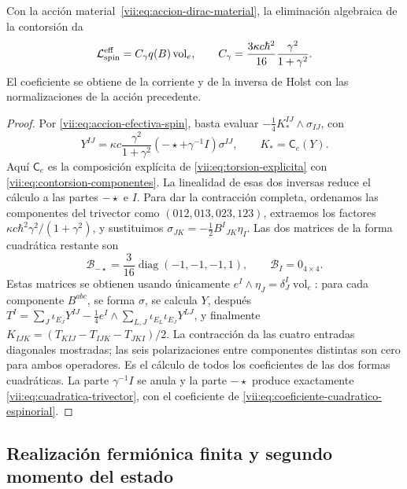 \begin{theorem}
\label{vii:thm:coeficiente-torsional-espinorial}
Con la acción material~\eqref{vii:eq:accion-dirac-material}, la
eliminación algebraica de la contorsión da
\begin{equation}
 \mathcal L_{\rm spin}^{\rm eff}
 =C_\gamma q(B)\operatorname{vol}_e,\qquad
 C_\gamma=\frac{3\kappa c\hbar^2}{16}
                      \frac{\gamma^2}{1+\gamma^2}.
 \label{vii:eq:coeficiente-cuadratico-espinorial}
\end{equation}
El coeficiente se obtiene de la corriente y de la inversa de Holst
con las normalizaciones de la acción precedente.
\end{theorem}
\begin{proof}
Por \eqref{vii:eq:accion-efectiva-spin}, basta evaluar
\(-\frac14K_*^{IJ}\wedge\sigma_{IJ}\), con
\[
 Y^{IJ}=\kappa c\frac{\gamma^2}{1+\gamma^2}
           (-\star+\gamma^{-1}I)\sigma^{IJ},\qquad
 K_*=\mathsf C_e(Y).
\]
Aquí \(\mathsf C_e\) es la composición explícita de
\eqref{vii:eq:torsion-explicita} con
\eqref{vii:eq:contorsion-componentes}. La linealidad de esas dos
inversas reduce el cálculo a las partes \(-\star\) e \(I\).
Para dar la contracción completa, ordenamos las componentes del
trivector como \((012,013,023,123)\), extraemos los factores
\(\kappa c\hbar^2\gamma^2/(1+\gamma^2)\), y sustituimos
\(\sigma_{JK}=-\frac12B^I{}_{JK}\eta_I\). Las dos matrices
de la forma cuadrática restante son
\begin{equation}
 \mathcal B_{-\star}
 =\frac3{16}\operatorname{diag}(-1,-1,-1,1),\qquad
 \mathcal B_I=0_{4\times4}.
 \label{vii:eq:matrices-contraccion-espinorial}
\end{equation}
Estas matrices se obtienen usando únicamente
\(e^I\wedge\eta_J=\delta_J^I\operatorname{vol}_e\): para
cada componente \(B^{abc}\), se forma \(\sigma\), se calcula
\(Y\), después
\(T^I=\sum_J\iota_{E_J}Y^{IJ}
 -\frac14e^I\wedge\sum_{L,J}\iota_{E_L}\iota_{E_J}Y^{LJ}\),
y finalmente
\(K_{IJK}=(T_{KIJ}-T_{IJK}-T_{JKI})/2\).
La contracción da las cuatro entradas diagonales mostradas; las
seis polarizaciones entre componentes distintas son cero para ambos
operadores. Es el cálculo de todos los coeficientes de las dos
formas cuadráticas. La parte \(\gamma^{-1}I\) se anula y la parte
\(-\star\) produce exactamente \eqref{vii:eq:cuadratica-trivector},
con el coeficiente de \eqref{vii:eq:coeficiente-cuadratico-espinorial}.
\end{proof}

\subsection{Realización fermiónica finita y segundo momento del estado}
\label{vii:subsec:segundo-momento-car}

